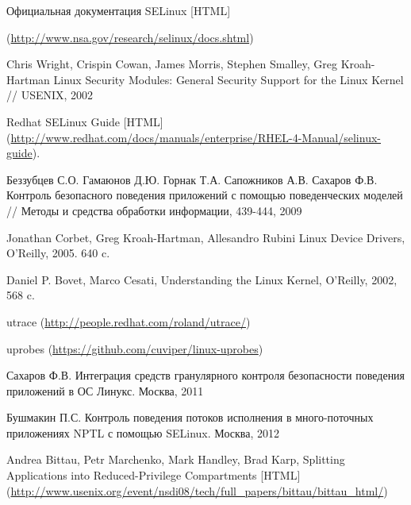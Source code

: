 \begin{thebibliography}{99}
Официальная документация SELinux [HTML] 

(\url{http://www.nsa.gov/research/selinux/docs.shtml})

Chris Wright, Crispin Cowan, James Morris, Stephen Smalley, Greg
Kroah-Hartman
Linux Security Modules: General Security Support for the Linux Kernel 
// USENIX, 2002


 Redhat SELinux Guide [HTML]
 (\url{http://www.redhat.com/docs/manuals/enterprise/RHEL-4-Manual/selinux-guide}).

Беззубцев С.О. Гамаюнов Д.Ю. Горнак Т.А. Сапожников А.В.
Сахаров Ф.В. Контроль безопасного поведения приложений
с помощью поведенческих моделей // Методы и средства обработки информации, 439-444, 2009

Jonathan Corbet, Greg Kroah-Hartman, Allesandro Rubini Linux Device Drivers, O'Reilly, 2005. 640 c.

Daniel P. Bovet, Marco Cesati, Understanding the Linux Kernel, O'Reilly, 2002, 568 c.
 
utrace
(\url{http://people.redhat.com/roland/utrace/})

uprobes
(\url{https://github.com/cuviper/linux-uprobes})

Сахаров Ф.В. Интеграция средств гранулярного контроля безопасности
поведения приложений в ОС Линукс. Москва, 2011

Бушмакин П.С. Контроль поведения потоков исполнения в много-поточных
приложениях NPTL с помощью SELinux. Москва, 2012


Andrea Bittau, Petr Marchenko, Mark Handley, Brad Karp,
Splitting Applications into Reduced-Privilege Compartments [HTML]
(\url{http://www.usenix.org/event/nsdi08/tech/full\_papers/bittau/bittau\_html/}) 

\end{thebibliography}
